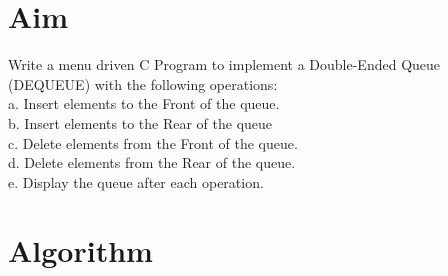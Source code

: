 
\section{Aim}
Write a menu driven C Program to implement a Double-Ended Queue (DEQUEUE) with the
following operations:
\\a. Insert elements to the Front of the queue.
\\b. Insert elements to the Rear of the queue
\\c. Delete elements from the Front of the queue.
\\d. Delete elements from the Rear of the queue.
\\e. Display the queue after each operation.

\section{Algorithm}
